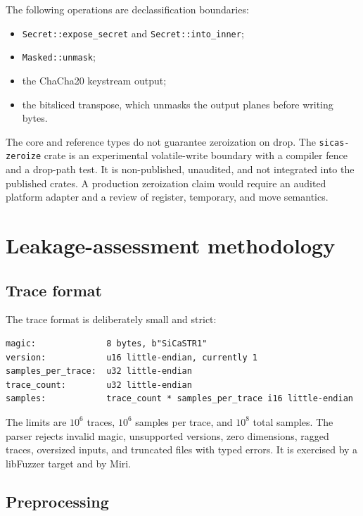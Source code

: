 \documentclass[11pt,a4paper]{article}
\newcommand{\code}[1]{\texttt{#1}}
\theoremstyle{plain}
\theoremstyle{definition}
\theoremstyle{remark}
\begin{document}
The following operations are declassification boundaries:

\begin{itemize}[leftmargin=1.5em]
  \item \code{Secret::expose\_secret} and \code{Secret::into\_inner};
  \item \code{Masked::unmask};
  \item the ChaCha20 keystream output;
  \item the bitsliced transpose, which unmasks the output planes before writing bytes.
\end{itemize}

The core and reference types do not guarantee zeroization on drop. The
\code{sicas-zeroize} crate is an experimental volatile-write boundary with a compiler
fence and a drop-path test. It is non-published, unaudited, and not integrated into the
published crates. A production zeroization claim would require an audited platform
adapter and a review of register, temporary, and move semantics.

\section{Leakage-assessment methodology}\label{sec:assessment}

\subsection{Trace format}

The trace format is deliberately small and strict:

\begin{verbatim}
magic:              8 bytes, b"SiCaSTR1"
version:            u16 little-endian, currently 1
samples_per_trace:  u32 little-endian
trace_count:        u32 little-endian
samples:            trace_count * samples_per_trace i16 little-endian
\end{verbatim}

The limits are \(10^6\) traces, \(10^6\) samples per trace, and \(10^8\) total samples.
The parser rejects invalid magic, unsupported versions, zero dimensions, ragged traces,
oversized inputs, and truncated files with typed errors. It is exercised by a
libFuzzer target and by Miri.

\subsection{Preprocessing}
\end{document}
